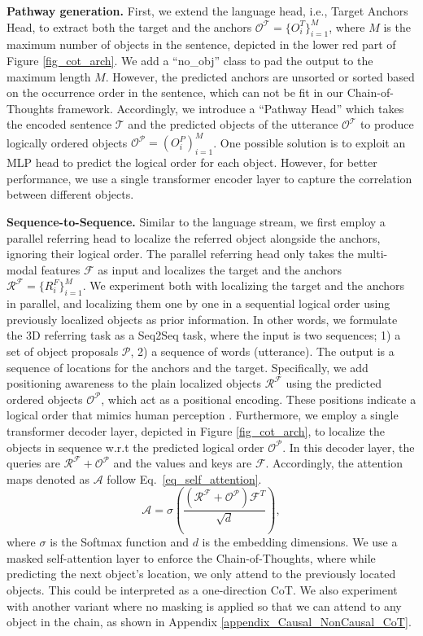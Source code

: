 \noindent \textbf{Pathway generation.}
First, we extend the language head, i.e., Target Anchors Head, to extract both the target and the anchors $\mathcal{O^T}=\{O^T_i \}_{i=1}^{M}$, where $M$ is the maximum number of objects in the sentence, depicted in the lower red part of Figure \ref{fig_cot_arch}.
We add a ``no\_obj'' class to pad the output to the maximum length $M$.
However, the predicted anchors are unsorted or sorted based on the occurrence order in the sentence, which can not be fit in our Chain-of-Thoughts framework.
Accordingly, we introduce a ``Pathway Head'' which takes the encoded sentence $\mathcal{T}$ and the predicted objects of the utterance $\mathcal{O^T}$ to produce logically ordered objects $\mathcal{O^P}=\left(O^P_i  \right)_{i=1}^{M}$.
One possible solution is to exploit an MLP head to predict the logical order for each object.
However, for better performance, we use a single transformer encoder layer to capture the correlation between different objects.

\noindent \textbf{Sequence-to-Sequence.}
Similar to the language stream, we first employ a parallel referring head to localize the referred object alongside the anchors, ignoring their logical order. The parallel referring head only takes the multi-modal features $\mathcal{F}$ as input and localizes the target and the anchors $\mathcal{R^F}=\{R^F_i\}_{i=1}^{M}$.
We experiment both with localizing the target and the anchors in parallel, and localizing them one by one in a sequential logical order using previously localized objects as prior information.
In other words, we formulate the 3D referring task as a Seq2Seq task, where the input is two sequences; 1) a set of object proposals $\mathcal{P}$, 2) a sequence of words (utterance). The output is a sequence of locations for the anchors and the target.
Specifically, we add positioning awareness to the plain localized objects $\mathcal{R^F}$ using the predicted ordered objects $\mathcal{O^P}$, which act as a positional encoding. These positions indicate a logical order that mimics human perception \citep{mcvay2009conducting, chen2017unified}.
Furthermore, we employ a single transformer decoder layer, depicted in Figure \ref{fig_cot_arch}, to localize the objects in sequence w.r.t the predicted logical order $\mathcal{O^P}$. In this decoder layer, the queries are $\mathcal{R^F}+\mathcal{O^P}$ and the values and keys are $\mathcal{F}$. Accordingly, the attention maps denoted as $\mathcal{A}$ follow Eq.~\ref{eq_self_attention}.
\begin{equation}
    \label{eq_self_attention}
    \mathcal{A} = \sigma(\frac{(\mathcal{R^F}+\mathcal{O^P}) \mathcal{F}^T}{\sqrt{d}}),
\end{equation}
where $\sigma$ is the Softmax function and $d$ is the embedding dimensions.
We use a masked self-attention layer to enforce the Chain-of-Thoughts, where while predicting the next object's location, we only attend to the previously located objects. This could be interpreted as a one-direction CoT.
We also experiment with another variant where no masking is applied so that we can attend to any object in the chain, as shown in Appendix \ref{appendix_Causal_NonCausal_CoT}.

